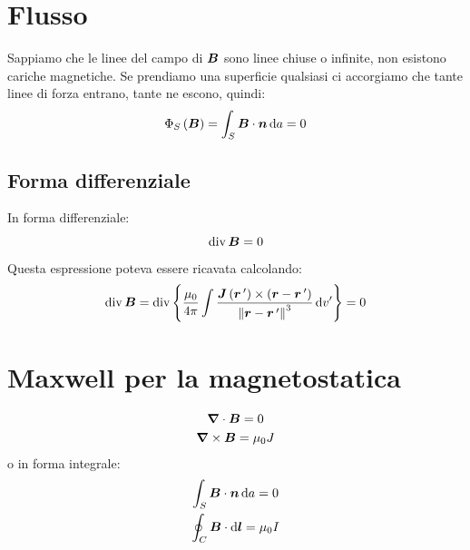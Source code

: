 \section{Flusso}
Sappiamo che le linee del campo di $\boldsymbol{B}$ sono linee chiuse o infinite, non esistono cariche magnetiche. Se prendiamo una superficie qualsiasi ci accorgiamo che tante linee di forza entrano, tante ne escono, quindi:
\begin{equation}
  \Phi_S\left(\boldsymbol{B}\right)=\int_S\boldsymbol{B}\cdot\boldsymbol{n}\,\mathrm{d} a=0
\end{equation}
\subsection{Forma differenziale}
In forma differenziale:
\begin{equation}
  \operatorname{div}\boldsymbol{B}=0
\end{equation}
Questa espressione poteva essere ricavata calcolando:
\[\operatorname{div}\boldsymbol{B}=\operatorname{div} \left\{\frac{\mu_0}{4\pi}\int\frac{\boldsymbol{J}\left(\boldsymbol{r}\,'\right)\times\left(\boldsymbol{r}-\boldsymbol{r}\,'\right)}{\left\lVert\boldsymbol{r}-\boldsymbol{r}\,'\right\rVert^3}\,\mathrm{d} v'\right\}=0\]
\section{Maxwell per la magnetostatica}
\begin{gather}
  \boldsymbol{\nabla}\cdot\boldsymbol{B}=0\\
  \boldsymbol{\nabla}\times\boldsymbol{B}=\mu_0 J
\end{gather}
o in forma integrale:
\begin{gather}
  \int_S\boldsymbol{B}\cdot\boldsymbol{n}\,\mathrm{d} a=0\\
  \oint_C\boldsymbol{B}\cdot\mathrm{d} \boldsymbol{l}=\mu_0 I
\end{gather}
